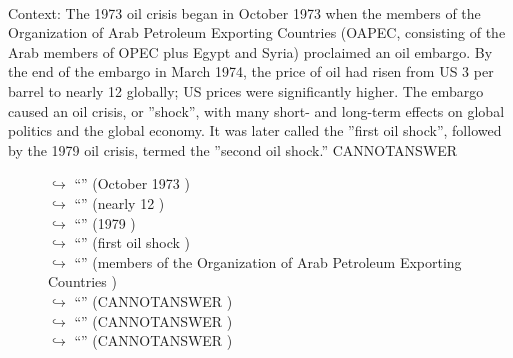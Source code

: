 \documentclass[11pt,a4paper, onecolumn]{article}
\begin{document}
\\ Context: The 1973 oil crisis began in October 1973 when the members of the Organization of Arab Petroleum Exporting Countries (OAPEC, consisting of the Arab members of OPEC plus Egypt and Syria) proclaimed an oil embargo. By the end of the embargo in March 1974, the price of oil had risen from US 3 per barrel to nearly  12 globally; US prices were significantly higher. The embargo caused an oil crisis, or ''shock'', with many short- and long-term effects on global politics and the global economy. It was later called the ''first oil shock'', followed by the 1979 oil crisis, termed the ''second oil shock.'' CANNOTANSWER

\begin{figure}[t] \small \begin{tcolorbox}[boxsep=0pt,left=5pt,right=0pt,top=2pt,colback = yellow!5] \begin{dialogue}
 \small 
\colorbox{pink!25}{$\hookrightarrow$}
{ ``'' (October 1973 ) }
\\
\colorbox{pink!25}{$\hookrightarrow$}
{ ``'' (nearly  12 ) }
\\
\colorbox{pink!25}{$\hookrightarrow$}
{ ``'' (1979 ) }
\\
\colorbox{pink!25}{$\hookrightarrow$}
{ ``'' (first oil shock ) }
\\
\colorbox{pink!25}{$\hookrightarrow$}
{ ``'' (members of the Organization of Arab Petroleum Exporting Countries ) }
\\
\colorbox{pink!25}{$\hookrightarrow$}
{ ``'' (CANNOTANSWER ) }
\\
\colorbox{pink!25}{$\hookrightarrow$}
{ ``'' (CANNOTANSWER ) }
\\
\colorbox{pink!25}{$\hookrightarrow$}
{ ``'' (CANNOTANSWER ) }
\\

\end{dialogue}
\end{tcolorbox}
\end{figure}
\end{document}
